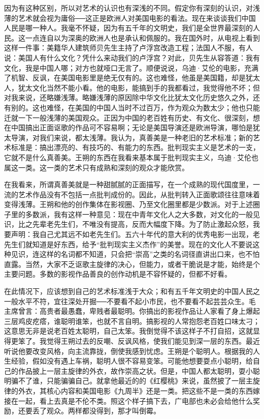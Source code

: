 因为有这种区别，所以对艺术的认识也有深浅的不同。假定你有深刻的认识，对浅薄的艺术就会视为庸俗──这正是欧洲人对美国电影的看法。现在来谈谈我们中国人民是哪一种人。我毫不怀疑，因为有五千年的文明史，我们是全世界最深刻的人民。这一点连自以为深奥的欧洲人也是承认和佩服的。我在国外时，从电视上看到这样一件事：美籍华人建筑师贝先生主持了卢浮宫改造工程；法国人不服，有人说：美国人有什么文化？凭什么来动我们的卢浮宫？对此，贝先生从容答道：我有文化，我是中国人哪；对方也就哑口无言了。顺便说说，乌迪·艾伦的电影，充满了机智、反讽，在美国电影里是绝无仅有的。这也难怪，他虽是美国籍，却是犹太人，犹太文化当然不能小看。他的电影，能搞到手的我都看过，我觉得他不坏；但对我来说，还略嫌浅薄。略嫌浅薄的原因除中华文化比犹太文化历史悠久之外，还有别的。这也难怪，在美国的中国人当时不过百万，作为观众为数太少；他也只能迁就一下一般浅薄的美国观众。正因为中国的老百姓有历史、有文化、很深刻，想在中国搞出正面讴歌的作品可不容易啊；无论是美国导演还是欧洲导演，哪怕是犹太导演，对我们来说，都太浅薄。我认为，真善美是一种老旧的艺术标准；新的艺术标准是：搞出漂亮的、有技巧的、有能力的东西。批判现实主义是艺术的一支，它就不是什么真善美。王朔的东西在我看来基本属于批判现实主义，乌迪·艾伦也属这一类。这一类的艺术只有成熟和深刻的观众才能欣赏。 

在我看来，所谓真善美就是一种甜腻腻的正面描写，在一个成熟的现代国度里，一流的艺术作品没有不包括一点批判成份的。因此，从批判转入正面歌颂往往意味着变得浅薄。王朔和他的创作集体在影视圈、乃至文化圈里都是少数派。对于上述圈子里的多数派，我有这样一种意见：现在中青年文化人之大多数，对文化的一般见识，比之先辈老先生们，不唯没有提高，反而大幅度下降。为了防止激起众怒，我要声明：我自己尤其远不如老先生们。五六十年代的意大利的优秀电影一出现，老先生们就知道是好东西，给予“批判现实主义杰作”的美誉。现在的文化人不要说这种见识，连这样的名词都不知道，只会把“崇高”之类的名词径直讲出口来，也不怕直露。当然，大家不乏讴歌主旋律的决心，但能力，或者干脆说是才能，始终是个主要问题。多数的影视作品善良的创作动机是不容怀疑的，但都不好看。 

在此情况下，应该想到自己的艺术标准浅于大众；和有五千年文明史的中国人民之一般水平不符，宜往深处开掘──不要看不起小市民，也不要看不起芸芸众生。毛主席曾言：高贵者最愚蠢，卑贱者最聪明。你搞出的影视作品让人家看了身上爆起三层鸡皮疙瘩，谁聪明谁笨，也就不言自明。搞影视的人常抱怨老百姓口味太刁；这意思无非是说老百姓太聪明，自己太笨。我倒觉得不该这样子不打自招，这就显得更笨了。我觉得王朔过去的反嘲、反讽风格，使我们能见到深一层的东西。最近听说他要改变风格，向主流靠拢，倒使我感到忧虑。王朔是个聪明人。根据我的人生经验，假如没有遇上车祸，聪明人很不容易变笨。可能他想要耍点小聪明，给自己的作品披上一层主旋律的外衣，故作崇高之状。但是，中国人都太聪明，耍小聪明骗不了谁，只能骗骗自己。就拿他最近的的《红樱桃》来说，虽然披了一层主旋律的外衣，其核心内容和美国电影《九周半》还是一类。把这些不是一类的东西嫁接在一起，看上去真是不伦不类。照这个样子搞下去，广电部也未必会给他什么奖励，还要丢了观众。两样都没得到，那才叫倒霉。

